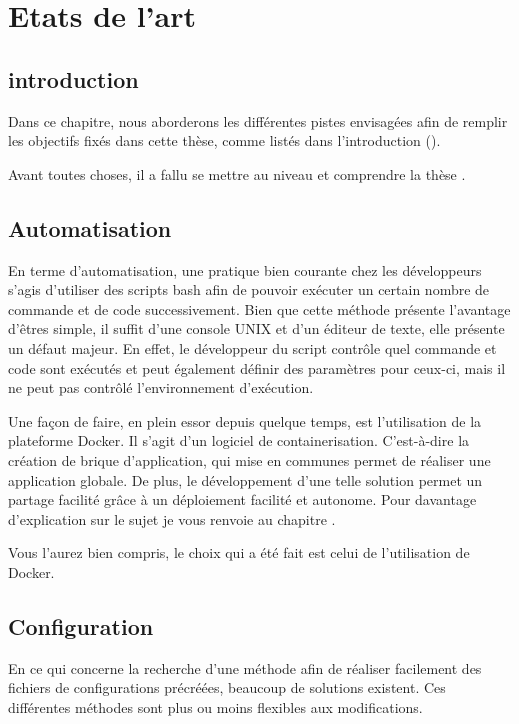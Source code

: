 \chapter{Etats de l'art}
\label{ch:state_art}

\section{introduction}
Dans ce chapitre, nous aborderons les différentes pistes envisagées afin de remplir les objectifs fixés dans cette thèse, comme listés dans l'introduction ().

Avant toutes choses, il a fallu se mettre au niveau et comprendre la thèse \thLeite.

\section{Automatisation}
En terme d'automatisation, une pratique bien courante chez les développeurs s'agis d'utiliser des scripts bash afin de pouvoir exécuter un certain nombre de commande et de code successivement. Bien que cette méthode présente l'avantage d'êtres simple, il suffit d'une console UNIX et d'un éditeur de texte, elle présente un défaut majeur. En effet, le développeur du script contrôle quel commande et code sont exécutés et peut également définir des paramètres pour ceux-ci, mais il ne peut pas contrôlé l'environnement d'exécution.

Une façon de faire, en plein essor depuis quelque temps, est l'utilisation de la plateforme Docker. Il s'agit d'un logiciel de containerisation. C'est-à-dire la création de brique d'application, qui mise en communes permet de réaliser une application globale. De plus, le développement d'une telle solution permet un partage facilité grâce à un déploiement facilité et autonome. Pour davantage d'explication sur le sujet je vous renvoie au chapitre  .

Vous l'aurez bien compris, le choix qui a été fait est celui de l'utilisation de Docker.

\section{Configuration}

En ce qui concerne la recherche d'une méthode afin de réaliser facilement des fichiers de configurations précréées, beaucoup de solutions existent. Ces différentes méthodes sont plus ou moins flexibles aux modifications.

